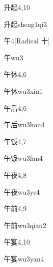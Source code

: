 \begin{entry}{升起}{4,10}
  \begin{phonetics}{升起}{sheng1qi3}
  \end{phonetics}
\end{entry}

\begin{entry}{午}{4}[Radical 十]
  \begin{phonetics}{午}{wu3}
  \end{phonetics}
\end{entry}

\begin{entry}{午休}{4,6}
  \begin{phonetics}{午休}{wu3xiu1}
  \end{phonetics}
\end{entry}

\begin{entry}{午后}{4,6}
  \begin{phonetics}{午后}{wu3hou4}
  \end{phonetics}
\end{entry}

\begin{entry}{午饭}{4,7}
  \begin{phonetics}{午饭}{wu3fan4}
  \end{phonetics}
\end{entry}

\begin{entry}{午夜}{4,8}
  \begin{phonetics}{午夜}{wu3ye4}
  \end{phonetics}
\end{entry}

\begin{entry}{午前}{4,9}
  \begin{phonetics}{午前}{wu3qian2}
  \end{phonetics}
\end{entry}

\begin{entry}{午宴}{4,10}
  \begin{phonetics}{午宴}{wu3yan4}
  \end{phonetics}
\end{entry}

